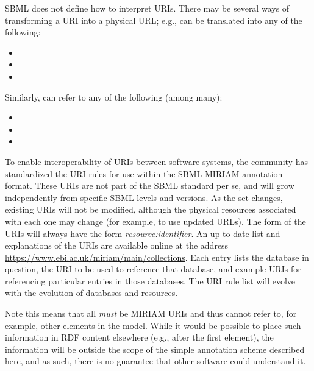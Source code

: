 SBML does not define how to interpret URIs.  There may be several
ways of transforming a URI into a physical URL; e.g.,
 can be translated into any
of the following:
\begin{itemize}\setlength{\parskip}{-1ex}

\item {}
\item {}
\item {}

\end{itemize}
\vspace*{-1ex}

Similarly,  can refer to
any of the following (among many):
\begin{itemize}\setlength{\parskip}{-1ex}

\item {}
\item {}
\item {}

\end{itemize}\vspace*{-1ex}

To enable interoperability of URIs between software systems, the
community has standardized the URI rules for use within the SBML
MIRIAM annotation format.  These URIs are not part of the SBML
standard per se, and will grow independently from specific SBML
levels and versions.  As the set changes, existing URIs will not
be modified, although the physical resources associated with each
one may change (for example, to use updated URLs).  The form of
the URIs will always have the form \emph{resource:identifier}.  An
up-to-date list and explanations of the URIs are available online
at the address \url{https://www.ebi.ac.uk/miriam/main/collections}.  Each
entry lists the database in question, the URI to be used to reference that database, and example URIs for referencing particular entries in those databases.
The URI rule list will evolve with the
evolution of databases and resources.

Note this means that all  \emph{must} be
MIRIAM URIs and thus cannot refer to, for example, other elements
in the model.  While it would be possible to place such
information in RDF content elsewhere (e.g., after the first
 element), the information will be outside
the scope of the simple annotation scheme described here, and as
such, there is no guarantee that other software could understand
it.

